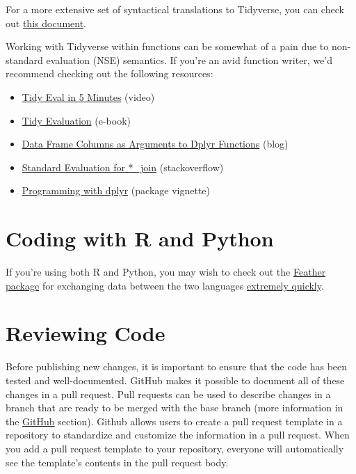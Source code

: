 \documentclass[
]{book}
\providecommand{\tightlist}{%
  \setlength{\itemsep}{0pt}\setlength{\parskip}{0pt}}
\begin{document}
For a more extensive set of syntactical translations to Tidyverse, you can check out \href{https://tavareshugo.github.io/data_carpentry_extras/base-r_tidyverse_equivalents/base-r_tidyverse_equivalents.html\#reshaping_data}{this document}.

Working with Tidyverse within functions can be somewhat of a pain due to non-standard evaluation (NSE) semantics. If you're an avid function writer, we'd recommend checking out the following resources:

\begin{itemize}
\tightlist
\item
  \href{https://www.youtube.com/watch?v=nERXS3ssntw}{Tidy Eval in 5 Minutes} (video)
\item
  \href{https://tidyeval.tidyverse.org/index.html}{Tidy Evaluation} (e-book)
\item
  \href{https://www.brodrigues.co/blog/2016-07-18-data-frame-columns-as-arguments-to-dplyr-functions/}{Data Frame Columns as Arguments to Dplyr Functions} (blog)
\item
  \href{https://stackoverflow.com/questions/28125816/r-standard-evaluation-for-join-dplyr}{Standard Evaluation for *\_join} (stackoverflow)
\item
  \href{https://dplyr.tidyverse.org/articles/programming.html}{Programming with dplyr} (package vignette)
\end{itemize}

\hypertarget{coding-with-r-and-python}{%
\section{Coding with R and Python}\label{coding-with-r-and-python}}

If you're using both R and Python, you may wish to check out the \href{https://www.rdocumentation.org/packages/feather/versions/0.3.3}{Feather package} for exchanging data between the two languages \href{https://blog.rstudio.com/2016/03/29/feather/}{extremely quickly}.

\hypertarget{reviewing-code}{%
\section{Reviewing Code}\label{reviewing-code}}

Before publishing new changes, it is important to ensure that the code has been tested and well-documented. GitHub makes it possible to document all of these changes in a pull request. Pull requests can be used to describe changes in a branch that are ready to be merged with the base branch (more information in the \protect\hyperlink{Github}{GitHub} section). Github allows users to create a pull request template in a repository to standardize and customize the information in a pull request. When you add a pull request template to your repository, everyone will automatically see the template's contents in the pull request body.
\end{document}
